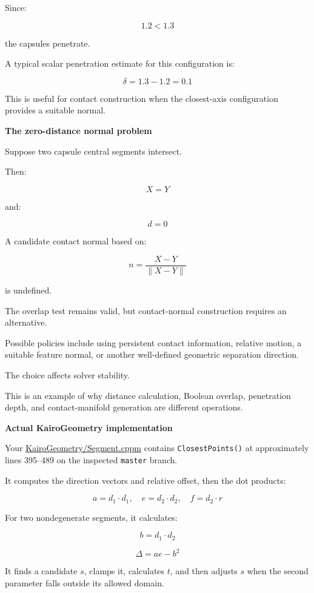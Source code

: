 Since:

\[
1.2<1.3
\]

the capsules penetrate.

A typical scalar penetration estimate for this configuration is:

\[
\boxed{ \delta=1.3-1.2=0.1 }
\]

This is useful for contact construction when the closest-axis configuration provides a suitable normal.

\textbf{The zero-distance normal problem}

Suppose two capsule central segments intersect.

Then:

\[
X=Y
\]

and:

\[
d=0
\]

A candidate contact normal based on:

\[
n=\frac{X-Y}{\|X-Y\|}
\]

is undefined.

The overlap test remains valid, but contact-normal construction requires an alternative.

Possible policies include using persistent contact information, relative motion, a suitable feature normal, or another well-defined geometric separation direction.

The choice affects solver stability.

This is an example of why distance calculation, Boolean overlap, penetration depth, and contact-manifold generation are different operations.

\textbf{Actual KairoGeometry implementation}

Your \href{https://github.com/swayam8624/KairoGeometry/blob/master/Segment.cppm?utm_source=chatgpt.com}{KairoGeometry/Segment.cppm} contains \texttt{ClosestPoints()} at approximately lines 395--489 on the inspected \texttt{master} branch.

It computes the direction vectors and relative offset, then the dot products:

\[
a=d_1\cdot d_1,\quad e=d_2\cdot d_2,\quad f=d_2\cdot r
\]

For two nondegenerate segments, it calculates:

\[
b=d_1\cdot d_2
\]

\[
\Delta=ae-b^2
\]

It finds a candidate \(s\), clamps it, calculates \(t\), and then adjusts \(s\) when the second parameter falls outside its allowed domain.

